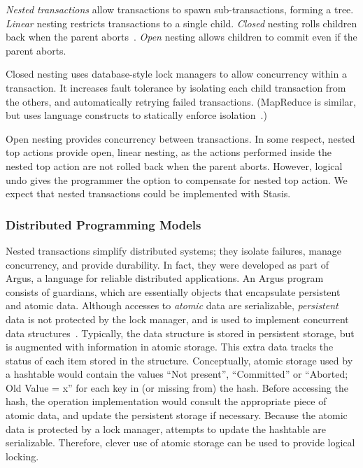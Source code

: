 \documentclass[letterpaper,twocolumn,10pt]{article}
\newcommand{\yad}{Stasis\xspace}
\begin{document}
{\em Nested transactions} allow transactions to spawn sub-transactions,
forming a tree.  {\em Linear} nesting
restricts transactions to a single child.  {\em Closed} nesting rolls
children back when the parent aborts~\cite{nestedTransactionBook}.
{\em Open} nesting allows children to commit even if the parent
aborts.

Closed nesting uses database-style lock managers to allow concurrency
within a transaction.  It increases fault tolerance by isolating each
child transaction from the others, and automatically retrying failed
transactions.  (MapReduce is similar, but uses language constructs to
statically enforce isolation~\cite{mapReduce}.)

Open nesting provides concurrency between transactions.  In
some respect, nested top actions provide open, linear nesting, as the
actions performed inside the nested top action are not rolled back
when the parent aborts.  However, logical undo gives the programmer
the option to compensate for nested top action. We expect that nested
transactions could be implemented with \yad.

\subsubsection{Distributed Programming Models}


Nested transactions simplify distributed systems; they isolate
failures, manage concurrency, and provide durability.  In fact, they
were developed as part of Argus, a language for reliable distributed applications.  An Argus
program consists of guardians, which are essentially objects that
encapsulate persistent and atomic data.  Although accesses to {\em atomic} data are 
serializable,  {\em persistent} data is not protected by the lock manager, 
and is used to implement concurrent data structures~\cite{argus}.  
Typically, the data structure is stored in persistent storage, but is augmented with
information in atomic storage.  This extra data tracks the
status of each item stored in the structure.  Conceptually, atomic 
storage used by a hashtable would contain the values ``Not present'',
``Committed'' or ``Aborted; Old Value = x'' for each key in (or
missing from) the hash.  Before accessing the hash, the operation
implementation would consult the appropriate piece of atomic data, and
update the persistent storage if necessary.  Because the atomic data is
protected by a lock manager, attempts to update the hashtable are serializable.
Therefore, clever use of atomic storage can be used to provide logical locking.
\end{document}
